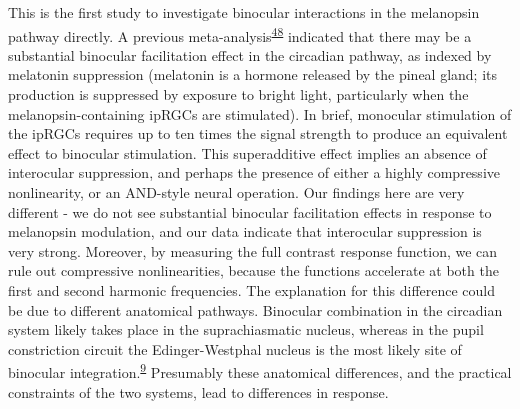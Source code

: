 \documentclass[
]{article}
\begin{document}
This is the first study to investigate binocular interactions in the melanopsin pathway directly. A previous meta-analysis\textsuperscript{\protect\hyperlink{ref-Spitschan2019}{48}} indicated that there may be a substantial binocular facilitation effect in the circadian pathway, as indexed by melatonin suppression (melatonin is a hormone released by the pineal gland; its production is suppressed by exposure to bright light, particularly when the melanopsin-containing ipRGCs are stimulated). In brief, monocular stimulation of the ipRGCs requires up to ten times the signal strength to produce an equivalent effect to binocular stimulation. This superadditive effect implies an absence of interocular suppression, and perhaps the presence of either a highly compressive nonlinearity, or an AND-style neural operation. Our findings here are very different - we do not see substantial binocular facilitation effects in response to melanopsin modulation, and our data indicate that interocular suppression is very strong. Moreover, by measuring the full contrast response function, we can rule out compressive nonlinearities, because the functions accelerate at both the first and second harmonic frequencies. The explanation for this difference could be due to different anatomical pathways. Binocular combination in the circadian system likely takes place in the suprachiasmatic nucleus, whereas in the pupil constriction circuit the Edinger-Westphal nucleus is the most likely site of binocular integration.\textsuperscript{\protect\hyperlink{ref-Mathot2018}{9}} Presumably these anatomical differences, and the practical constraints of the two systems, lead to differences in response.
\end{document}
